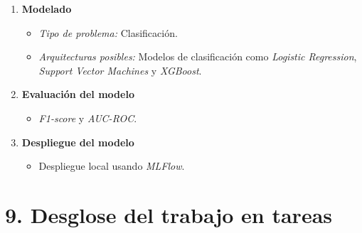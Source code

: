 \documentclass[
11pt, %
]{charter}
\begin{document}
\begin{enumerate}
\begin{itemize}
\begin{itemize}
            \end{itemize}
    \end{itemize}
  \item \textbf{Modelado}
    \begin{itemize}
        \item \textit{Tipo de problema:} Clasificación.
        \item \textit{Arquitecturas posibles:} Modelos de clasificación como \textit{Logistic Regression}, \textit{Support Vector Machines} y \textit{XGBoost}.
    \end{itemize}
  \item \textbf{Evaluación del modelo}
    \begin{itemize}
        \item \textit{F1-score} y \textit{AUC-ROC}.
    \end{itemize}
  \item \textbf{Despliegue del modelo}
    \begin{itemize}
        \item Despliegue local usando \textit{MLFlow}.
    \end{itemize}
\end{enumerate}

\section{9. Desglose del trabajo en tareas}
\label{sec:wbs}
\end{document}
